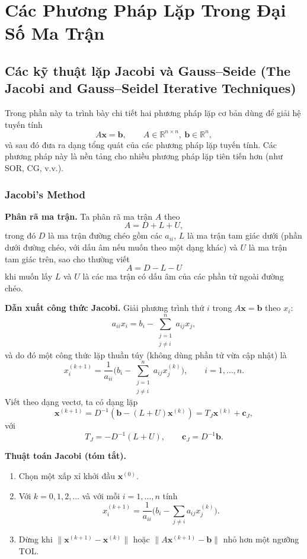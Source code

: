 \vspace*{1em}
\chapter{Các Phương Pháp Lặp Trong Đại Số Ma Trận}

\section{Các kỹ thuật lặp Jacobi và Gauss–Seide (The Jacobi and Gauss–Seidel Iterative Techniques)}

Trong phần này ta trình bày chi tiết hai phương pháp lặp cơ bản dùng để giải hệ tuyến tính
\[
A\mathbf{x}=\mathbf{b},\qquad A\in\mathbb{R}^{n\times n},\ \mathbf{b}\in\mathbb{R}^n,
\]
và sau đó đưa ra dạng tổng quát của các phương pháp lặp tuyến tính. Các phương pháp này là nền tảng
cho nhiều phương pháp lặp tiên tiến hơn (như SOR, CG, v.v.).

\subsection{Jacobi's Method}

\textbf{Phân rã ma trận.}
Ta phân rã ma trận $A$ theo
\[
A = D + L + U,
\]
trong đó $D$ là ma trận đường chéo gồm các $a_{ii}$, $L$ là ma trận tam giác dưới (phần dưới đường chéo, với dấu âm nếu muốn theo một dạng khác) và $U$ là ma trận tam giác trên, sao cho thường viết
\[
A = D - L - U
\]
khi muốn lấy $L$ và $U$ là các ma trận có dấu âm của các phần tử ngoài đường chéo.

\textbf{Dẫn xuất công thức Jacobi.}
Giải phương trình thứ $i$ trong $A\mathbf{x}=\mathbf{b}$ theo $x_i$:
\[
a_{ii} x_i = b_i - \sum_{\substack{j=1\\ j\ne i}}^{n} a_{ij} x_j,
\]
và do đó một công thức lặp thuần túy (không dùng phần tử vừa cập nhật) là
\[
x_i^{(k+1)} = \frac{1}{a_{ii}}\Big( b_i - \sum_{\substack{j=1\\ j\ne i}}^{n} a_{ij} x_j^{(k)}\Big),
\qquad i=1,\dots,n.
\]
Viết theo dạng vectơ, ta có dạng lặp
\[
\mathbf{x}^{(k+1)} = D^{-1}(\mathbf{b} - (L+U)\mathbf{x}^{(k)})
          = T_J \mathbf{x}^{(k)} + \mathbf{c}_J,
\]
với
\[
T_J = -D^{-1}(L+U),\qquad \mathbf{c}_J = D^{-1}\mathbf{b}.
\]

\textbf{Thuật toán Jacobi (tóm tắt).}
\begin{enumerate}
  \item Chọn một xấp xỉ khởi đầu $\mathbf{x}^{(0)}$.
  \item Với $k=0,1,2,\dots$ và với mỗi $i=1,\dots,n$ tính
    \[
    x_i^{(k+1)} = \frac{1}{a_{ii}}\Big( b_i - \sum_{j\ne i} a_{ij} x_j^{(k)}\Big).
    \]
  \item Dừng khi $\|\mathbf{x}^{(k+1)}-\mathbf{x}^{(k)}\|$ hoặc $\|A\mathbf{x}^{(k+1)}-\mathbf{b}\|$ nhỏ hơn một ngưỡng TOL.
\end{enumerate}

